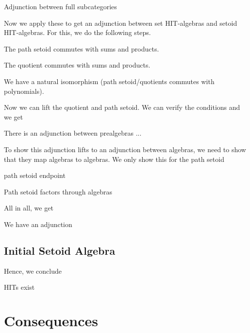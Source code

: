 \documentclass[9pt]{entcs}
\newcommand{\1}{\type{1}} %
\begin{document}
\begin{lemma}
Adjunction between full subcategories
\end{lemma}

Now we apply these to get an adjunction between set HIT-algebras and setoid HIT-algebras.
For this, we do the following steps.

\begin{lemma}
The path setoid commutes with sums and products.

The quotient commutes with sums and products.
\end{lemma}

\begin{lemma}
We have a natural isomorphism (path setoid/quotients commutes with polynomials).
\end{lemma}

Now we can lift the quotient and path setoid.
We can verify the conditions and we get

\begin{lemma}
There is an adjunction between prealgebras ...
\end{lemma}

To show this adjunction lifts to an adjunction between algebras, we need to show that they map algebras to algebras.
We only show this for the path setoid

\begin{lemma}
path setoid endpoint
\end{lemma}

\begin{lemma}
Path setoid factors through algebras
\end{lemma}

All in all, we get

\begin{proposition}
We have an adjunction
\end{proposition}

\subsection{Initial Setoid Algebra}

Hence, we conclude

\begin{theorem}
HITs exist
\end{theorem}

\section{Consequences}
\end{document}

